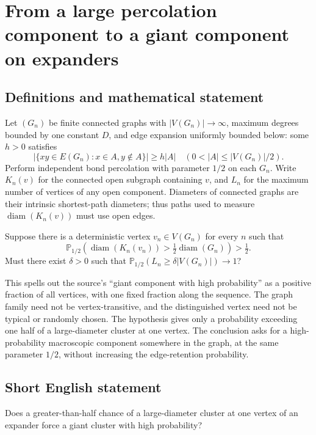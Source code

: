 \documentclass[11pt,a4paper]{article}
\begin{document}
\section*{From a large percolation component to a giant component on expanders}\label{statement}

\subsection{Definitions and mathematical statement}
Let $(G_n)$ be finite connected graphs with $|V(G_n)|\to\infty$, maximum degrees bounded by one constant $D$, and edge expansion uniformly bounded below: some $h>0$ satisfies
\[
|\{xy\in E(G_n):x\in A,y\notin A\}|\ge h|A|
\quad(0<|A|\le |V(G_n)|/2).
\]
Perform independent bond percolation with parameter $1/2$ on each $G_n$. Write $K_n(v)$ for the connected open subgraph containing $v$, and $L_n$ for the maximum number of vertices of any open component. Diameters of connected graphs are their intrinsic shortest-path diameters; thus paths used to measure $\operatorname{diam}(K_n(v))$ must use open edges.

Suppose there is a deterministic vertex $v_n\in V(G_n)$ for every $n$ such that
\[
\mathbb P_{1/2}\!\left(\operatorname{diam}(K_n(v_n))>
\tfrac12\operatorname{diam}(G_n)\right)>\tfrac12.
\]
Must there exist $\delta>0$ such that $\mathbb P_{1/2}(L_n\ge\delta|V(G_n)|)\to1$?

This spells out the source's ``giant component with high probability'' as a positive fraction of all vertices, with one fixed fraction along the sequence. The graph family need not be vertex-transitive, and the distinguished vertex need not be typical or randomly chosen. The hypothesis gives only a probability exceeding one half of a large-diameter cluster at one vertex. The conclusion asks for a high-probability macroscopic component somewhere in the graph, at the same parameter $1/2$, without increasing the edge-retention probability.
\subsection{Short English statement}
Does a greater-than-half chance of a large-diameter cluster at one vertex of an expander force a giant cluster with high probability?
\end{document}
